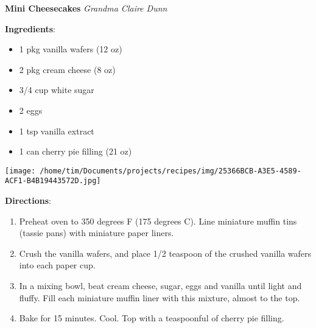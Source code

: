 \documentclass[11pt, twoside, openany]{book}
\begin{document}
\noindent\begin{minipage}[t]{\linewidth}%
{\Large\textbf{Mini Cheesecakes}} \label{mini-cheesecakes}\hfill\textit{Grandma Claire Dunn}\\
\noindent\begin{minipage}[t]{0.78\linewidth}%
\textbf{Ingredients}:\vspace{-3mm}
\begin{multicols}{2}
\begin{itemize}\setlength\itemsep{-1mm}
\item 1 pkg vanilla wafers (12 oz)
\item 2 pkg cream cheese (8 oz)
\item 3/4 cup white sugar
\item 2 eggs
\item 1 tsp vanilla extract
\item 1 can cherry pie filling (21 oz)
\end{itemize}
\end{multicols}
\end{minipage}
\noindent\begin{minipage}[t]{0.18\linewidth}
\centering \strut\vspace*{-\baselineskip}\newline
\texttt{[image: /home/tim/Documents/projects/recipes/img/25366BCB-A3E5-4589-ACF1-B4B19443572D.jpg]}\\
\end{minipage}\vspace{3mm}
\textbf{Directions}:
\vspace{-3mm}\begin{enumerate}\setlength\itemsep{-1mm}
\item Preheat oven to 350 degrees F (175 degrees C). Line miniature muffin tins (tassie pans) with miniature paper liners.
\item Crush the vanilla wafers, and place 1/2 teaspoon of the crushed vanilla wafers into each paper cup.
\item In a mixing bowl, beat cream cheese, sugar, eggs and vanilla until light and fluffy. Fill each miniature muffin liner with this mixture, almost to the top.
\item Bake for 15 minutes. Cool. Top with a teaspoonful of cherry pie filling.
\end{enumerate}
\end{minipage}\vspace{8mm}
\end{document}
